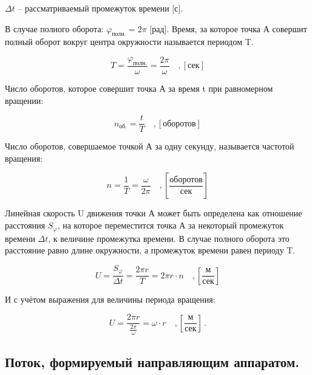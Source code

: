 $\Delta t$ -- рассматриваемый промежуток времени [с].

\vspace{0.5 cm}

В случае полного оборота: $ \varphi_{\text{полн.}} = 2 \pi $ [рад].
Время, за которое точка А совершит полный оборот вокруг центра окружности называется периодом T.

$$
   T = \frac{\varphi_{\text{полн.}}}{\omega} = \frac{2 \pi}{\omega} \quad ,[\text{сек}]
$$

Число оборотов, которое совершит точка А за время t при равномерном вращении:

$$
   n_{\text{об.}} = \frac{t}{T} \quad ,[\text{оборотов}]
$$

Число оборотов, совершаемое точкой А за одну секунду, называется частотой вращения:

$$
   n = \frac{1}{T} = \frac{\omega}{2 \pi} \quad ,\left[ \frac{\text{оборотов}}{\text{сек}} \right]
$$

Линейная скорость U движения точки А может быть определена как отношение расстояния $ S_{\varphi} $, на которое переместится точка А за некоторый промежуток времени $\Delta t$, к величине промежутка времени. В случае полного оборота это расстояние равно длине окружности, а промежуток времени равен периоду T.

$$
   U = \frac{S_{\varphi}}{\Delta t} = \frac{2 \pi r}{T} = 2 \pi r \cdot n  \quad , \left[ \frac{\text{м}}{\text{сек}} \right]
$$ 

И с учётом выражения для величины периода вращения:

$$
   \displaystyle U = \frac{ 2 \pi r}{ \frac{2 \pi}{\omega} } = \omega \cdot r  \quad , \left[ \frac{\text{м}}{\text{сек}} \right] \, .
$$





\newpage


\subsection{Поток, формируемый направляющим аппаратом.}

